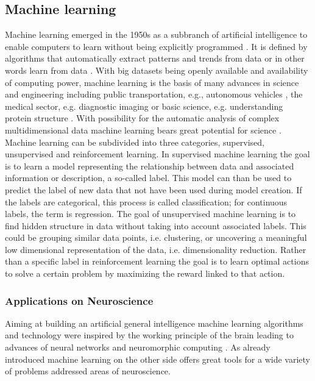 \subsection{Machine learning}
Machine learning emerged in the 1950s as a subbranch of artificial intelligence to enable computers to learn without being explicitly programmed \cite{Samual1959}. It is defined by algorithms that automatically extract patterns and trends from data or in other words learn from data \cite{Hastie2009}. With big datasets being openly available and availability of computing power, machine learning is the basis of many advances in science and engineering including public transportation, e.g., autonomous vehicles \cite{Leonard2020}, the medical sector, e.g. diagnostic imaging \cite{Liu2020} or basic science, e.g. understanding protein structure \cite{Jumper2021}. With possibility for the automatic analysis of complex multidimensional data machine learning bears great potential for science \cite{Brunton2019}.\\
Machine learning can be subdivided into three categories, supervised, unsupervised and reinforcement learning. In supervised machine learning the goal is to learn a model representing the relationship between data and associated information or description, a so-called label. This model can than be used to predict the label of new data that not have been used during model creation. If the labels are categorical, this process is called classification; for continuous labels, the term is regression. The goal of unsupervised machine learning is to find hidden structure in data without taking into account associated labels. This could be grouping similar data points, i.e. clustering, or uncovering a meaningful low dimensional representation of the data, i.e. dimensionality reduction. Rather than a specific label in reinforcement learning the goal is to learn optimal actions to solve a certain problem by maximizing the reward linked to that action.

\subsubsection{Applications on Neuroscience}
Aiming at building an artificial general intelligence machine learning algorithms and technology were inspired by the working principle of the brain leading to advances of neural networks \cite{Macpherson2021} and neuromorphic computing \cite{Choi2022}. As already introduced machine learning on the other side offers great tools for a wide variety of problems addressed areas of neuroscience. 

